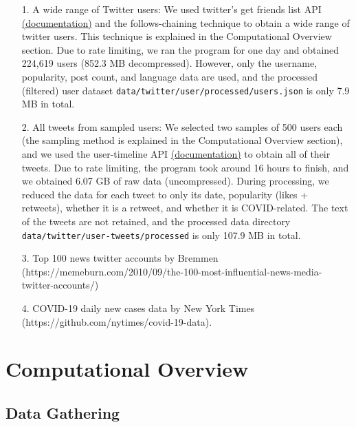 \documentclass{article}
\newcommand{\C}{\texttt}
\begin{document}
    \begin{itemize}
        \item[1.] A wide range of Twitter users: We used twitter's get friends list API \href{https://developer.twitter.com/en/docs/twitter-api/v1/accounts-and-users/follow-search-get-users/api-reference/get-friends-list}{(documentation)} and the follows-chaining technique to obtain a wide range of twitter users. This technique is explained in the Computational Overview section. Due to rate limiting, we ran the program for one day and obtained 224,619 users (852.3 MB decompressed). However, only the username, popularity, post count, and language data are used, and the processed (filtered) user dataset \C{data/twitter/user/processed/users.json} is only 7.9 MB in total.
         
        \item[2.] All tweets from sampled users: We selected two samples of 500 users each (the sampling method is explained in the Computational Overview section), and we used the user-timeline API \href{https://developer.twitter.com/en/docs/twitter-api/v1/tweets/timelines/api-reference/get-statuses-user_timeline}{(documentation)} to obtain all of their tweets. Due to rate limiting, the program took around 16 hours to finish, and we obtained 6.07 GB of raw data (uncompressed). During processing, we reduced the data for each tweet to only its date, popularity (likes + retweets), whether it is a retweet, and whether it is COVID-related. The text of the tweets are not retained, and the processed data directory \C{data/twitter/user-tweets/processed} is only 107.9 MB in total.
        
        \item[3.] Top 100 news twitter accounts by Bremmen (https://memeburn.com/2010/09/the-100-most-influential-news-media-twitter-accounts/)
        \item[4.] COVID-19 daily new cases data by New York Times (https://github.com/nytimes/covid-19-data). 
    \end{itemize}
 
    \section{Computational Overview}

    \subsection*{Data Gathering}
    \indent
\end{document}
